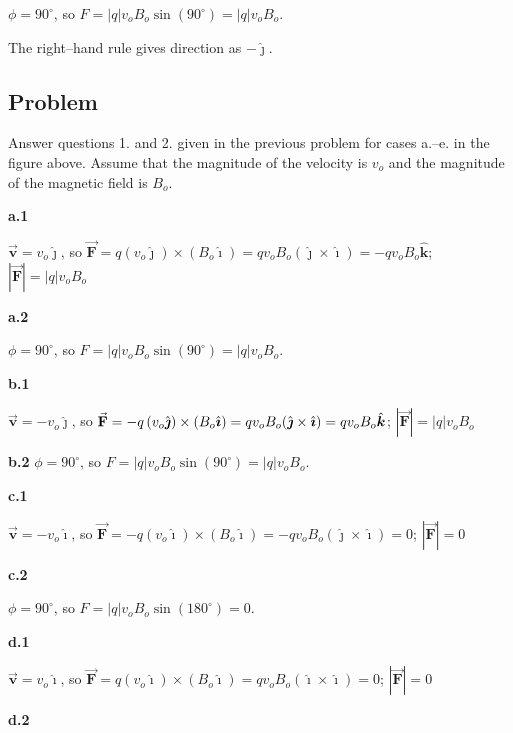 \documentclass{article}
\newcommand{\ihat}[0]{\hat{\boldsymbol{\imath}}}
\newcommand{\jhat}[0]{\hat{\boldsymbol{\jmath}}}
\newcommand{\khat}[0]{\hat{\boldsymbol{k}}}
\newcommand{\bfvec}[1]{\vec{\mathbf{#1}}}
\begin{document}
$\phi=90^{\circ}$, so $F = |q|v_oB_o\sin(90^{\circ})=|q|v_oB_o$.

The right--hand rule gives direction as $-\jhat$.

\subsection{Problem}

Answer questions 1. and 2. given in the previous problem for cases a.--e. in the figure above. Assume that the magnitude of the velocity is $v_o$ and the magnitude of the magnetic field is $B_o$.

{\bf a.1}

\ifsolutions
$\bfvec{v}=v_o\jhat$, so $\bfvec{F} = q(v_o\jhat)\times (B_o\ihat)=qv_oB_o(\jhat\times \ihat)=-qv_oB_o\khat$; $|\bfvec{F}|=|q|v_oB_o$
\else

\vskip 48pt
\fi
\ifsolutions\else
\vskip 48pt
\fi

{\bf a.2}

\ifsolutions
$\phi=90^{\circ}$, so $F = |q|v_oB_o\sin(90^{\circ})=|q|v_oB_o$.
\fi

{\bf b.1}

\ifsolutions
$\bfvec{v}=-v_o\jhat$, so $\bfvec{F} = -q\thinspace (v_o\jhat)\times (B_o\ihat)=qv_oB_o(\jhat\times \ihat)=qv_oB_o\khat$; $|\bfvec{F}|=|q|v_oB_o$
\else

\vskip 48pt
\fi
\ifsolutions\else
\vskip 48pt
\fi
{\bf b.2}
\ifsolutions
$\phi=90^{\circ}$, so $F = |q|v_oB_o\sin(90^{\circ})=|q|v_oB_o$.
\else

\vskip 48pt
\fi
\ifsolutions\else
\vskip 48pt
\fi

{\bf c.1}

\ifsolutions
$\bfvec{v}=-v_o\ihat$, so $\bfvec{F} = -q(v_o\ihat)\times (B_o\ihat)=-qv_oB_o(\jhat\times \ihat)=0$; $|\bfvec{F}|=0$
\else

\vskip 48pt
\fi
\ifsolutions\else
\vskip 48pt
\fi

{\bf c.2}

\ifsolutions
$\phi=90^{\circ}$, so $F = |q|v_oB_o\sin(180^{\circ})=0$.
\else

\vskip 48pt
\fi
\ifsolutions\else
\vskip 48pt
\fi

{\bf d.1}

\ifsolutions
$\bfvec{v}=v_o\ihat$, so $\bfvec{F} = q(v_o\ihat)\times (B_o\ihat)=qv_oB_o(\ihat\times \ihat)=0$; $|\bfvec{F}|=0$
\else

\vskip 48pt
\fi
\ifsolutions\else
\vskip 48pt
\fi

{\bf d.2}
\end{document}
